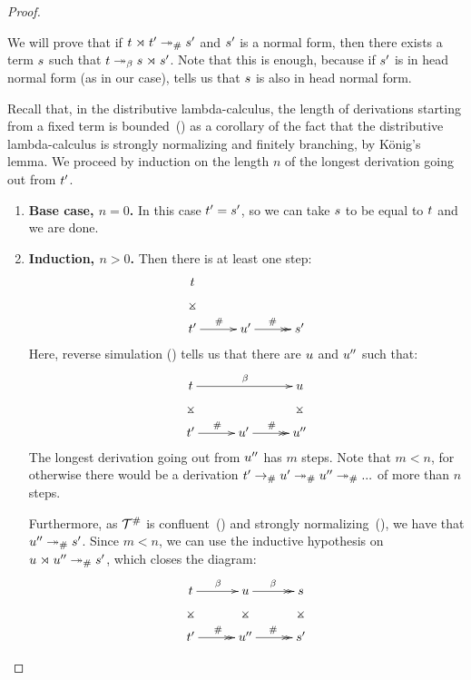 \begin{proof}
\begin{itemize}
    We will prove that if $t \mathrel{\rtimes} t' \mathrel{\twoheadrightarrow}_{\mathtt{\#}} s'$ and $s'$ is a normal form,
    then there exists a term $s$ such that $t \mathrel{\twoheadrightarrow_\beta} s \mathrel{\rtimes} s'$.
    Note that this is enough, because if $s'$ is in head normal form (as in our case),
     tells us that $s$ is also in head normal form.

    Recall that, in the distributive lambda-calculus,
    the length of derivations starting from a fixed term
    is bounded~()
    as a corollary of the fact that the distributive lambda-calculus
    is strongly normalizing and finitely branching, by K\"onig's lemma.
    We proceed by induction on the length $n$ of the longest derivation going out from $t'$.
    \begin{enumerate}
      \item {\bf Base case, $n = 0$.} In this case $t' = s'$,
        so we can take $s$ to be equal to $t$ and we are done.
      \item {\bf Induction, $n > 0$.}
        Then there is at least one step:
        \[
        \xymatrix@C=1cm{
          \tm  \ar@{}[d]|*=0[@]{\rtimes}  & &      \\
          \tm' \ar@{->}[r]^{\dist} & \tmthree' \ar@{->>}[r]^{\dist} & \tmtwo' \\
        }
        \]
        Here, reverse simulation () tells us that there are $u$ and $u''$
        such that:
        \[
        \xymatrix@C=1cm{
          \tm  \ar@{}[d]|*=0[@]{\rtimes} \ar@{->}[rr]^{\beta} & & \tmthree  \ar@{}[d]|*=0[@]{\rtimes} \\
          \tm' \ar@{->}[r]^{\dist} & \tmthree' \ar@{->>}[r]^{\dist} & \tmthree'' \\
        }
        \]
        The longest derivation going out from $u''$ has $m$ steps.
        Note that $m < n$, for otherwise there would be a derivation $t' \mathrel{\to_{\mathtt{\#}}} u' \mathrel{\twoheadrightarrow_{\mathtt{\#}}} u'' \mathrel{\twoheadrightarrow_{\mathtt{\#}}} ...$ 
        of more than $n$ steps.

        Furthermore, as $\mathcal{T}^{\mathtt{\#}}$ is confluent~() and strongly normalizing~(),
        we have that $u'' \mathrel{\twoheadrightarrow}_{\mathtt{\#}} s'$.
        Since $m < n$, we can use the inductive hypothesis
        on $u \mathrel{\rtimes} u'' \mathrel{\twoheadrightarrow}_{\mathtt{\#}} s'$, which closes the diagram:
        \[
        \xymatrix@C=1cm{
          \tm  \ar@{}[d]|*=0[@]{\rtimes} \ar@{->}[r]^{\beta} & \tmthree \ar@{}[d]|*=0[@]{\rtimes} \ar@{->>}[r]^{\beta} & \tmtwo \ar@{}[d]|*=0[@]{\rtimes} \\
          \tm' \ar@{->>}[r]^{\dist} & \tmthree'' \ar@{->>}[r]^{\dist} & \tmtwo' \\
        }
        \]
    \end{enumerate}
\end{itemize}
\end{proof}

